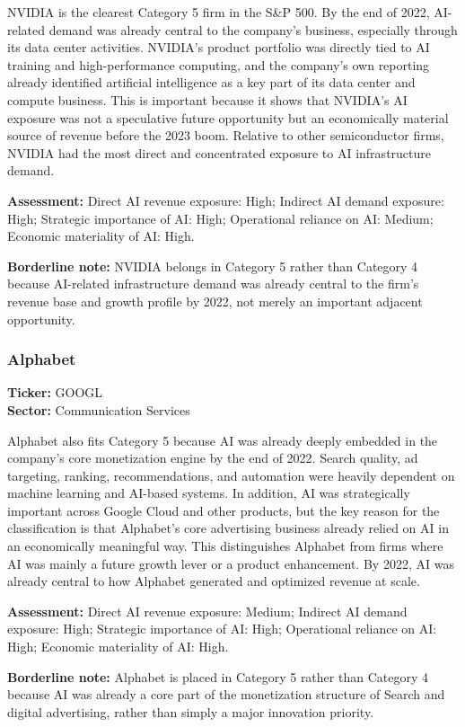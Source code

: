 \documentclass{article}
\begin{document}
NVIDIA is the clearest Category 5 firm in the S\&P 500. By the end of 2022, AI-related demand was already central to the company’s business, especially through its data center activities. NVIDIA’s product portfolio was directly tied to AI training and high-performance computing, and the company’s own reporting already identified artificial intelligence as a key part of its data center and compute business. This is important because it shows that NVIDIA’s AI exposure was not a speculative future opportunity but an economically material source of revenue before the 2023 boom. Relative to other semiconductor firms, NVIDIA had the most direct and concentrated exposure to AI infrastructure demand.

\textbf{Assessment:} Direct AI revenue exposure: High; Indirect AI demand exposure: High; Strategic importance of AI: High; Operational reliance on AI: Medium; Economic materiality of AI: High.

\textbf{Borderline note:} NVIDIA belongs in Category 5 rather than Category 4 because AI-related infrastructure demand was already central to the firm’s revenue base and growth profile by 2022, not merely an important adjacent opportunity.

\subsubsection*{Alphabet}
\textbf{Ticker:} GOOGL \\
\textbf{Sector:} Communication Services

Alphabet also fits Category 5 because AI was already deeply embedded in the company’s core monetization engine by the end of 2022. Search quality, ad targeting, ranking, recommendations, and automation were heavily dependent on machine learning and AI-based systems. In addition, AI was strategically important across Google Cloud and other products, but the key reason for the classification is that Alphabet’s core advertising business already relied on AI in an economically meaningful way. This distinguishes Alphabet from firms where AI was mainly a future growth lever or a product enhancement. By 2022, AI was already central to how Alphabet generated and optimized revenue at scale.

\textbf{Assessment:} Direct AI revenue exposure: Medium; Indirect AI demand exposure: High; Strategic importance of AI: High; Operational reliance on AI: High; Economic materiality of AI: High.

\textbf{Borderline note:} Alphabet is placed in Category 5 rather than Category 4 because AI was already a core part of the monetization structure of Search and digital advertising, rather than simply a major innovation priority.
\end{document}

